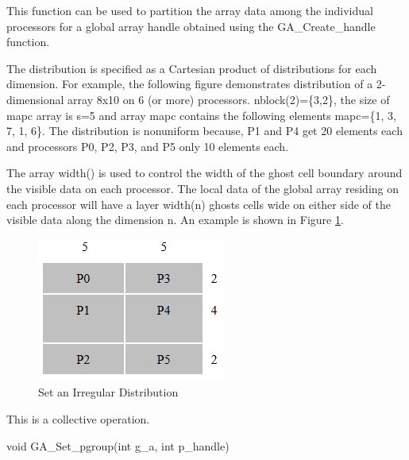\documentclass[12pt]{article}
\begin{document}
\begin{desc}

  This function can be used to partition the array data among the
  individual processors for a global array handle obtained using the
  GA_Create_handle function.

  The distribution is specified as a Cartesian product of
  distributions for each dimension. For example, the following figure
  demonstrates distribution of a 2-dimensional array 8x10 on 6 (or
  more) processors. nblock(2)=\{3,2\}, the size of mapc array is s=5 and
  array mapc contains the following elements mapc=\{1, 3, 7, 1, 6\}. The
  distribution is nonuniform because, P1 and P4 get 20 elements each
  and processors P0, P2, P3, and P5 only 10 elements each.

  The array width() is used to control the width of the ghost cell
  boundary around the visible data on each processor. The local data
  of the global array residing on each processor will have a layer
  width(n) ghosts cells wide on either side of the visible data along
  the dimension n.
An example is shown in Figure \ref{setirregdist}.

\begin{figure}
\centering
\includegraphics{SetIrregDist}
\caption{Set an Irregular Distribution}
\label{setirregdist}
\end{figure}

  This is a collective operation.

\end{desc}


\begin{capi}
\begin{ccode}
void GA_Set_pgroup(int g_a, int p_handle)
\end{ccode}
\begin{funcargs}
\end{funcargs}
\end{capi}
\end{document}
